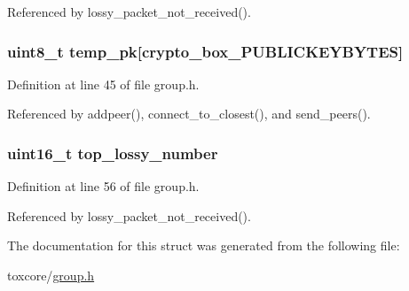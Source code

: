 Referenced by lossy\+\_\+packet\+\_\+not\+\_\+received().

\hypertarget{struct_group___peer_a46affbcc202b25e96fd1f5238e9e97e0}{
\subsubsection[{temp\+\_\+pk}]{\setlength{\rightskip}{0pt plus 5cm}uint8\+\_\+t temp\+\_\+pk\mbox{[}crypto\+\_\+box\+\_\+\+P\+U\+B\+L\+I\+C\+K\+E\+Y\+B\+Y\+T\+E\+S\mbox{]}}}\label{struct_group___peer_a46affbcc202b25e96fd1f5238e9e97e0}


Definition at line 45 of file group.\+h.



Referenced by addpeer(), connect\+\_\+to\+\_\+closest(), and send\+\_\+peers().

\hypertarget{struct_group___peer_a9af1180e5be1617fd013dee9ce29bf24}{
\subsubsection[{top\+\_\+lossy\+\_\+number}]{\setlength{\rightskip}{0pt plus 5cm}uint16\+\_\+t top\+\_\+lossy\+\_\+number}}\label{struct_group___peer_a9af1180e5be1617fd013dee9ce29bf24}


Definition at line 56 of file group.\+h.



Referenced by lossy\+\_\+packet\+\_\+not\+\_\+received().



The documentation for this struct was generated from the following file\+:\begin{DoxyCompactItemize}
\item 
toxcore/\hyperlink{toxcore_2group_8h}{group.\+h}\end{DoxyCompactItemize}
